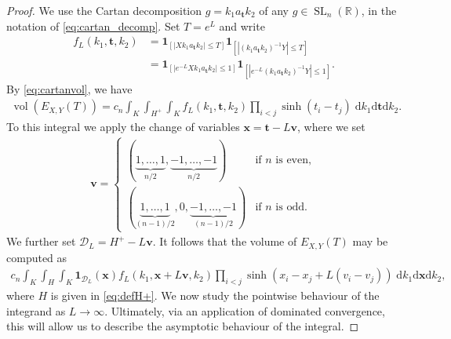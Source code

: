 \documentclass[10pt,a4paper]{amsart}
\def \R {{\mathbb R}}
\newcommand{\SL}{\operatorname{SL}}
\newcommand{\vol}{\operatorname{vol}}
\newcommand{\x}{\mathbf{x}}
\begin{document}
\begin{proof}
We use the 
Cartan decomposition     $g = k_1 a_{\mathbf{t}} k_2$ of any 
 $g \in \SL_n(\R)$, in the notation of \eqref{eq:cartan_decomp}.
   Set $T = e^L$ and write
  \begin{align*} 
  f_L(k_1,\mathbf{t},k_2) &= \mathbf{1}_{[| X k_1 a_{\mathbf{t}} k_2 | \le T]} 
      \mathbf{1}_{[| (k_1 a_{\mathbf{t}} k_2)^{-1} Y | \le T]}  \\
      &=
      \mathbf{1}_{[| e^{-L} X k_1 a_{\mathbf{t}} k_2 | \le 1]}  
      \mathbf{1}_{[|e^{-L} (k_1 a_{\mathbf{t}} k_2)^{-1} Y | \le 1]} .
  \end{align*}
  By \eqref{eq:cartanvol}, we have  
  \begin{align*}
      \vol(E_{X,Y}(T)) = c_n \int_K \int_{H^{+}}  \int_K f_L(k_1,\mathbf{t},k_2) \prod_{i<j} \sinh(t_i - t_j) \;
      \mathrm{d}k_1
      \mathrm{d} \mathbf{t}
      \mathrm{d}k_2.
  \end{align*}
  To this integral we apply the change of variables $\mathbf{x} = \mathbf{t} - L\mathbf{v}$, where we set 
  \begin{align}\label{eq:definitionof v}
  \mathbf{v} =
\begin{cases}
(\underbrace{1,\dots,1}_{n/2},
 \underbrace{-1,\dots,-1}_{n/2}) &\text{if $n$ is even},\\
(\underbrace{1,\dots,1}_{(n-1)/2},
 0,
 \underbrace{-1,\dots,-1}_{(n-1)/2}) & \text{if $n$ is odd.}
\end{cases}
  \end{align}
  We further set  $\mathcal{D}_L = H^+ -L \mathbf{v}$. It follows that the volume of $E_{X,Y}(T)$ may be computed as
  \begin{align}\label{eq:volEafterchangeofvariables}
      c_n \int_K \int_{H}  \int_K 
     \mathbf{1}_{\mathcal{D}_L}(\mathbf{x})
     f_L(k_1,\mathbf{x}+L\mathbf{v},k_2) \prod_{i<j} \sinh(x_i - x_j + L(v_i-v_j)) \;
      \mathrm{d}k_1
      \mathrm{d} \x
      \mathrm{d}k_2,
  \end{align}
  where $H$ is given in \eqref{eq:defH+}. 
  We now study the pointwise behaviour of the integrand as $L \to \infty$. Ultimately, via an application of dominated convergence, this will allow us to describe the asymptotic behaviour of the integral.


\end{proof}
\end{document}
